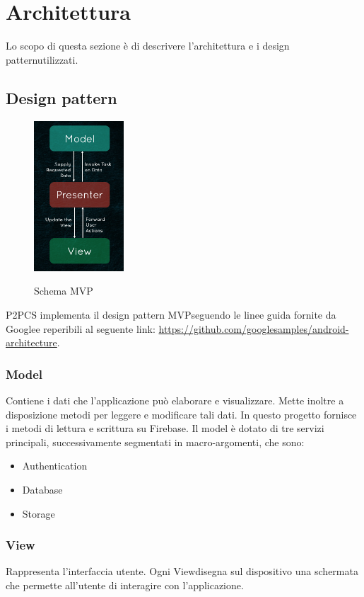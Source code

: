 \section{Architettura}
Lo scopo di questa sezione è di descrivere l'architettura e i design pattern\glosp utilizzati.
\subsection{Design pattern}
\begin{figure}[H]
	\centering
	\includegraphics[width=0.3\textwidth]
	{res/images/mvp.png}\\
	\caption{Schema MVP}
	\label{Schema MVP}
\end{figure}
P2PCS implementa il design pattern MVP\glosp seguendo le linee guida fornite da Google\glosp e reperibili al seguente link: \url{https://github.com/googlesamples/android-architecture}.
\newline
\subsubsection{Model}
Contiene i dati che l’applicazione può elaborare e visualizzare. Mette inoltre a disposizione metodi per leggere e modificare tali dati.
In questo progetto fornisce i metodi di lettura e scrittura su Firebase\glo.
Il model è dotato di tre servizi principali, successivamente segmentati in macro-argomenti, che sono:
\begin{itemize}
	\item Authentication
	\item Database
	\item Storage
\end{itemize}
\subsubsection{View}
Rappresenta l’interfaccia utente. Ogni View\glosp disegna sul dispositivo una schermata che permette all'utente di interagire con l’applicazione.

